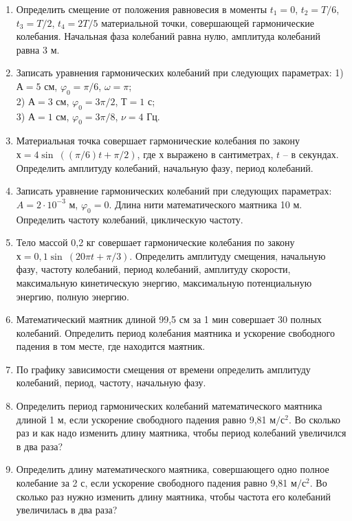 \documentclass[a6paper, 11pt]{diss_4}
\renewcommand{\'}{\,'}
\begin{document}
\begin{enumerate}
\item Определить смещение от положения равновесия в моменты $t_1=0$, $t_2=T/6$, $t_3=T/2$, $t_4=2T/5$ материальной точки, совершающей гармонические колебания. Начальная фаза колебаний равна нулю, амплитуда колебаний равна 3 м.

\item Записать уравнения гармонических колебаний при следующих параметрах:
1) $А=5$ см, $\varphi_0= \pi/6$, $\omega=\pi$; \\
2) $А=3$ см, $\varphi_0= 3\pi/2$, $Т=1$ с; \\
3) $А=1$ см, $\varphi_0= 3\pi/8$,   $\nu=4$ Гц.

\item Материальная точка совершает гармонические колебания по закону $х=4\sin\ ((\pi/6)t+\pi/2)$, где $х$ выражено в сантиметрах, $t$ -- в секундах. Определить амплитуду колебаний, начальную фазу, период колебаний.

\item Записать уравнение гармонических колебаний при следующих параметрах: $A=2\cdot10^{-3}$ м, $\varphi_0=0$. Длина нити математического маятника 10 м.  Определить частоту колебаний, циклическую частоту.

\item Тело массой 0,2 кг совершает гармонические колебания по закону $х=0,1\sin\ (20\pi t+\pi/3)$. Определить амплитуду смещения, начальную фазу, частоту колебаний, период колебаний, амплитуду скорости, максимальную кинетическую энергию, максимальную потенциальную энергию, полную энергию.

\item Математический маятник длиной 99,5 см за 1 мин совершает 30 полных колебаний. Определить период колебания маятника и ускорение свободного падения в том месте, где находится маятник.

\item По графику зависимости смещения от времени определить амплитуду колебаний, период, частоту, начальную фазу.

\item Определить период гармонических колебаний математического маятника длиной 1 м, если ускорение свободного падения равно 9,81 $м/с^2$. Во сколько раз и как надо изменить длину маятника, чтобы период колебаний увеличился в два раза?

\item Определить длину математического маятника, совершающего одно полное колебание за 2 с, если ускорение свободного падения равно 9,81 $м/с^2$. Во сколько раз нужно изменить длину маятника, чтобы частота его колебаний увеличилась в два раза?


\end{enumerate}
\end{document}
